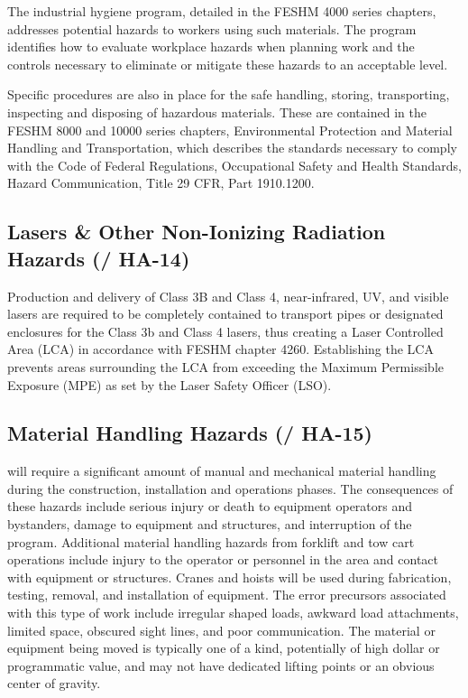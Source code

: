 The industrial hygiene program, detailed in the FESHM 4000 series
chapters, addresses potential hazards to workers using such
materials. The program identifies how to evaluate workplace hazards
when planning work and the controls necessary to eliminate or mitigate
these hazards to an acceptable level.

Specific procedures are also in place for the safe handling, storing,
transporting, inspecting and disposing of hazardous materials. These
are contained in the FESHM 8000 and 10000 series chapters,
Environmental Protection and Material Handling and Transportation,
which describes the standards necessary to comply with the Code of
Federal Regulations, Occupational Safety and Health Standards, Hazard
Communication, Title 29 CFR, Part 1910.1200.


\subsection{Lasers \& Other Non-Ionizing Radiation Hazards (/ HA-14)}

Production and delivery of Class 3B and Class 4, near-infrared, UV,
and visible lasers are required to be completely contained to
transport pipes or designated enclosures for the Class 3b and Class 4
lasers, thus creating a Laser Controlled Area (LCA) in accordance with
FESHM chapter 4260.  Establishing the LCA prevents areas surrounding
the LCA from exceeding the Maximum Permissible Exposure (MPE) as set
by the Laser Safety Officer (LSO).

\subsection{Material Handling Hazards (/ HA-15)}

 will require a significant amount of manual and mechanical
material handling during the construction, installation and operations
phases.  The consequences of these hazards include serious injury or
death to equipment operators and bystanders, damage to equipment and
structures, and interruption of the program.  Additional material
handling hazards from forklift and tow cart operations include injury
to the operator or personnel in the area and contact with equipment or
structures. Cranes and hoists will be used during fabrication,
testing, removal, and installation of equipment. The error precursors
associated with this type of work include irregular shaped loads,
awkward load attachments, limited space, obscured sight lines, and
poor communication.  The material or equipment being moved is
typically one of a kind, potentially of high dollar or programmatic
value, and may not have dedicated lifting points or an obvious center
of gravity.

